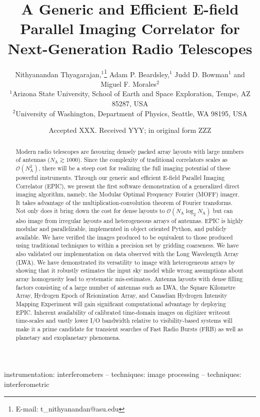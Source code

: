 \documentclass[a4paper,fleqn,usenatbib]{mnras}
\title[E-field Parallel Imaging Correlator]{A Generic and Efficient E-field Parallel Imaging Correlator for Next-Generation Radio Telescopes}
\author[Thyagarajan et al.]{
Nithyanandan Thyagarajan,$^{1}$\thanks{E-mail: t\_nithyanandan@asu.edu}
Adam P. Beardsley,$^{1}$
Judd D. Bowman$^{1}$
\newauthor
and Miguel F. Morales$^{2}$
\\
$^{1}$Arizona State University, School of Earth and Space Exploration, Tempe, AZ 85287, USA\\
$^{2}$University of Washington, Department of Physics, Seattle, WA 98195, USA\\
}
\date{Accepted XXX. Received YYY; in original form ZZZ}
\newcommand{\Nant}{N_\textrm{A}}
\begin{document}
\label{firstpage}
\pagerange{\pageref{firstpage}--\pageref{lastpage}}
\maketitle

\begin{abstract}
Modern radio telescopes are favouring densely packed array layouts with large numbers of antennas ($\Nant\gtrsim 1000$). Since the complexity of traditional correlators scales as $\mathcal{O}(\Nant^2)$, there will be a steep cost for realizing the full imaging potential of these powerful instruments. Through our generic and efficient E-field Parallel Imaging Correlator (EPIC), we present the first software demonstration of a generalized direct imaging algorithm, namely, the Modular Optimal Frequency Fourier (MOFF) imager. It takes advantage of the multiplication-convolution theorem of Fourier transforms. Not only does it bring down the cost for dense layouts to $\mathcal{O}(\Nant\log_2\Nant)$ but can also image from irregular layouts and heterogeneous arrays of antennas. EPIC is highly modular and parallelizable, implemented in object oriented Python, and publicly available. We have verified the images produced to be equivalent to those produced using traditional techniques to within a precision set by gridding coarseness. We have also validated our implementation on data observed with the Long Wavelength Array (LWA). We have demonstrated its versatility to image with heterogeneous arrays by showing that it robustly estimates the input sky model while wrong assumptions about array homogeneity lead to systematic mis-estimates. Antenna layouts with dense filling factors consisting of a large number of antennas such as LWA, the Square Kilometre Array, Hydrogen Epoch of Reionization Array, and Canadian Hydrogen Intensity Mapping Experiment will gain significant computational advantage by deploying EPIC. Inherent availability of calibrated time-domain images on digitizer writeout time-scales and vastly lower I/O bandwidth relative to visibility-based systems will make it a prime candidate for transient searches of Fast Radio Bursts (FRB) as well as planetary and exoplanetary phenomena. 
\end{abstract}

\begin{keywords}
instrumentation: interferometers -- techniques: image processing -- techniques: interferometric
\end{keywords}
\end{document}
